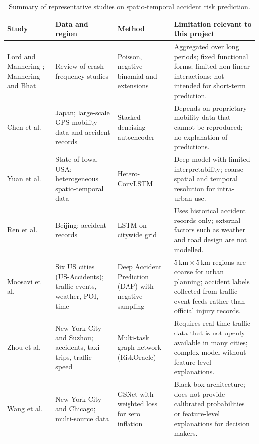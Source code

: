 \begin{table}[t]
\centering
\caption{Summary of representative studies on spatio-temporal accident risk prediction.}
\label{tab:literature}
\footnotesize
\begin{tabularx}{\textwidth}{L{2.6cm} L{3.0cm} L{3.4cm} Y}
\toprule
\textbf{Study} & \textbf{Data and region} & \textbf{Method} & \textbf{Limitation relevant to this project} \\
\midrule
Lord and Mannering \cite{lord2010statistical}; Mannering and Bhat \cite{mannering2014analytic} & Review of crash-frequency studies & Poisson, negative binomial and extensions & Aggregated over long periods; fixed functional forms; limited non-linear interactions; not intended for short-term prediction. \\
Chen et al.\ \cite{chen2016learning} & Japan; large-scale GPS mobility data and accident records & Stacked denoising autoencoder & Depends on proprietary mobility data that cannot be reproduced; no explanation of predictions. \\
Yuan et al.\ \cite{yuan2018hetero} & State of Iowa, USA; heterogeneous spatio-temporal data & Hetero-ConvLSTM & Deep model with limited interpretability; coarse spatial and temporal resolution for intra-urban use. \\
Ren et al.\ \cite{ren2018deep} & Beijing; accident records & LSTM on citywide grid & Uses historical accident records only; external factors such as weather and road design are not modelled. \\
Moosavi et al.\ \cite{moosavi2019accident} & Six US cities (US-Accidents); traffic events, weather, POI, time & Deep Accident Prediction (DAP) with negative sampling & 5\,km\,$\times$\,5\,km regions are coarse for urban planning; accident labels collected from traffic-event feeds rather than official injury records. \\
Zhou et al.\ \cite{zhou2020riskoracle} & New York City and Suzhou; accidents, taxi trips, traffic speed & Multi-task graph network (RiskOracle) & Requires real-time traffic data that is not openly available in many cities; complex model without feature-level explanations. \\
Wang et al.\ \cite{wang2021gsnet} & New York City and Chicago; multi-source data & GSNet with weighted loss for zero inflation & Black-box architecture; does not provide calibrated probabilities or feature-level explanations for decision makers. \\
\bottomrule
\end{tabularx}
\end{table}

